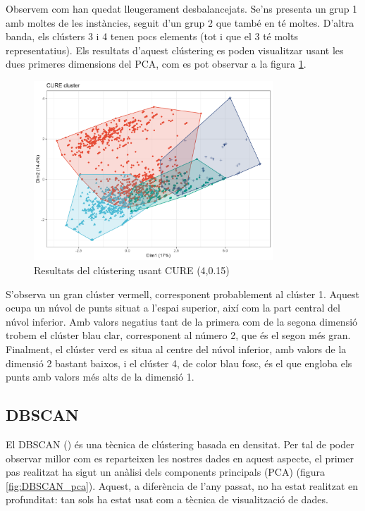 Observem com han quedat lleugerament desbalancejats. Se’ns presenta un grup 1 amb moltes de les instàncies, seguit d'un grup 2 que també en té moltes. D'altra banda, els clústers 3 i 4 tenen pocs elements (tot i que el 3 té molts representatius). Els resultats d'aquest clústering es poden visualitzar usant les dues primeres dimensions del PCA, com es pot observar a la figura \ref{fig:CURE_res}.

\begin{figure}[H]
    \centering
    \includegraphics[width=0.8\textwidth]{Images/4_clustering/CURE/cure.png}
    \caption{Resultats del clústering usant CURE (4,0.15)}
    \label{fig:CURE_res}
\end{figure}

S'observa un gran clúster vermell, corresponent probablement al clúster 1. Aquest ocupa un núvol de punts situat a l'espai superior, així com la part central del núvol inferior. Amb valors negatius tant de la primera com de la segona dimensió trobem el clúster blau clar, corresponent al número 2, que és el segon més gran. Finalment, el clúster verd es situa al centre del núvol inferior, amb valors de la dimensió 2 bastant baixos, i el clúster 4, de color blau fosc, és el que engloba els punts amb valors més alts de la dimensió 1.

\subsection{DBSCAN}

El DBSCAN (\cite{dbscan}) és una tècnica de clústering basada en densitat. Per tal de poder observar millor com es reparteixen les nostres dades en aquest aspecte, el primer pas realitzat ha sigut un anàlisi dels components principals (PCA) (figura \ref{fig:DBSCAN_pca}). Aquest, a diferència de l'any passat, no ha estat realitzat en profunditat: tan sols ha estat usat com a tècnica de visualització de dades.

